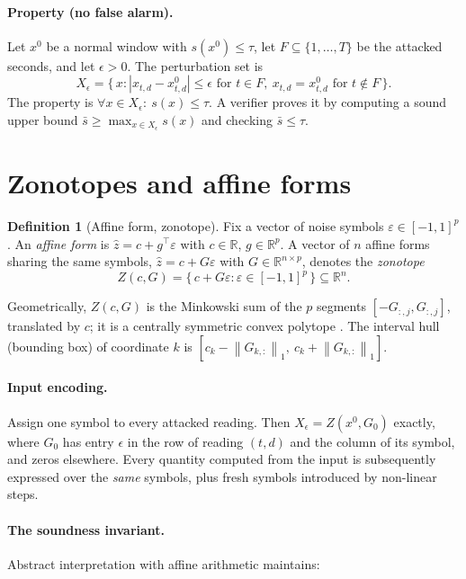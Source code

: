 \documentclass[11pt]{article}
\theoremstyle{definition}
\newtheorem{definition}[theorem]{Definition}
\theoremstyle{remark}
\newcommand{\R}{\mathbb{R}}
\newcommand{\eps}{\varepsilon}
\newcommand{\abs}[1]{\left\lvert #1 \right\rvert}
\newcommand{\norm}[1]{\left\lVert #1 \right\rVert}
\begin{document}
\paragraph{Property (no false alarm).} Let $x^0$ be a normal window with $s(x^0)\le\tau$, let $F \subseteq \{1,\dots,T\}$ be the attacked seconds, and let $\epsilon>0$. The perturbation set is
\begin{equation}
X_\epsilon = \bigl\{\, x : \abs{x_{t,d} - x^0_{t,d}} \le \epsilon \text{ for } t\in F,\ x_{t,d} = x^0_{t,d} \text{ for } t\notin F \,\bigr\}.
\end{equation}
The property is $\forall x\in X_\epsilon:\ s(x)\le\tau$. A verifier proves it by computing a sound upper bound $\bar s \ge \max_{x\in X_\epsilon} s(x)$ and checking $\bar s \le \tau$.

\section{Zonotopes and affine forms}

\begin{definition}[Affine form, zonotope]
Fix a vector of noise symbols $\eps\in[-1,1]^p$. An \emph{affine form} is $\hat z = c + g^\top \eps$ with $c\in\R$, $g\in\R^p$. A vector of $n$ affine forms sharing the same symbols, $\hat z = c + G\eps$ with $G\in\R^{n\times p}$, denotes the \emph{zonotope}
\begin{equation}
Z(c,G) = \{\, c + G\eps : \eps\in[-1,1]^p \,\} \subseteq \R^n .
\end{equation}
\end{definition}

Geometrically, $Z(c,G)$ is the Minkowski sum of the $p$ segments $[-G_{:,j}, G_{:,j}]$, translated by $c$; it is a centrally symmetric convex polytope \cite{ziegler1995}. The interval hull (bounding box) of coordinate $k$ is $[c_k - \norm{G_{k,:}}_1,\ c_k + \norm{G_{k,:}}_1]$.

\paragraph{Input encoding.} Assign one symbol to every attacked reading. Then $X_\epsilon = Z(x^0, G_0)$ exactly, where $G_0$ has entry $\epsilon$ in the row of reading $(t,d)$ and the column of its symbol, and zeros elsewhere. Every quantity computed from the input is subsequently expressed over the \emph{same} symbols, plus fresh symbols introduced by non-linear steps.

\paragraph{The soundness invariant.} Abstract interpretation \cite{cousot1977} with affine arithmetic \cite{comba1993,defigueiredo2004} maintains:
\end{document}

